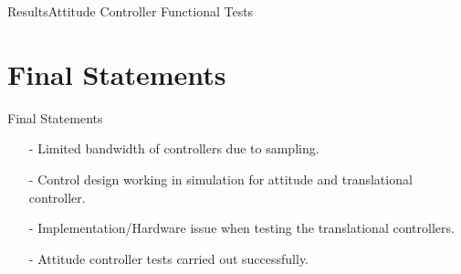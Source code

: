 \begin{frame}{Results}{Attitude Controller Functional Tests}
\begin{minipage}{\linewidth}
\begin{minipage}{0.49\linewidth}
\begin{figure}[H]
              \end{figure}               
          \end{minipage}
      \end{minipage}  
\end{frame}

\section{Final Statements}
\begin{frame}{Final Statements}{}
    \begin{itemize} 
        \item[-] Limited bandwidth of controllers due to sampling.
        \item[-] Control design working in simulation for attitude and translational controller. 
        \item[-] Implementation/Hardware issue when testing the translational controllers.
        \item[-] Attitude controller tests carried out successfully.
    \end{itemize}   
\end{frame}
